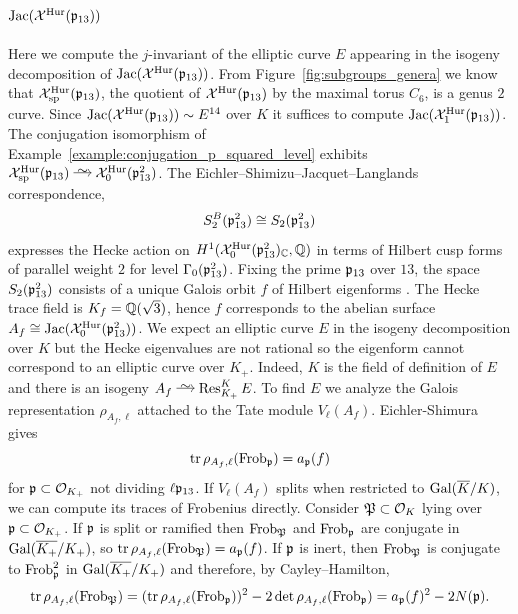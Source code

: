 \documentclass[main.tex]{subfiles}
\begin{document}
\subsection{$\operatorname{\mathrm{Jac}}(\mathcal{X}^{\mathrm{Hur}}(\mathfrak{p}_{13}))$}

Here we compute the $j$-invariant of the elliptic curve $E$ appearing in the isogeny decomposition of $\operatorname{\mathrm{Jac}}(\mathcal{X}^{\mathrm{Hur}}(\mathfrak{p}_{13}))$. From Figure~\ref{fig:subgroups_genera} we know that $\mathcal{X}_{\mathrm{sp}}^{\mathrm{Hur}}(\mathfrak{p}_{13})$, the quotient of $\mathcal{X}^{\mathrm{Hur}}(\mathfrak{p}_{13})$ by the maximal torus $C_6$, is a genus $2$ curve. Since $\operatorname{\mathrm{Jac}}(\mathcal{X}^{\mathrm{Hur}}(\mathfrak{p}_{13})) \sim E^{14}$ over $K$ it suffices to compute $\operatorname{\mathrm{Jac}}(\mathcal{X}_1^{\mathrm{Hur}}(\mathfrak{p}_{13}))$. The conjugation isomorphism of Example~\ref{example:conjugation_p_squared_level} exhibits $\X_{\mathrm{sp}}^{\Hur}(\p_{13}) \iso \X_0^{\Hur}(\p_{13}^2)$. The Eichler--Shimizu--Jacquet--Langlands correspondence,
\[ S^B_2(\mathfrak{p}_{13}^2) \cong S_2(\mathfrak{p}_{13}^2) \]
expresses the Hecke action on $H^1(\mathcal{X}_0^{\mathrm{Hur}}(\mathfrak{p}_{13}^2)_{\mathbb{C}}, \mathbb{Q})$ in terms of Hilbert cusp forms of parallel weight $2$ for level $\Gamma_0(\mathfrak{p}_{13}^2)$. Fixing the prime $\mathfrak{p}_{13}$ over $13$, the space $S_2(\mathfrak{p}_{13}^2)$ consists of a unique Galois orbit $f$ of Hilbert eigenforms \cite{lmfdb:hmf-3.3.49.1-169.4-a}. The Hecke trace field is $K_f = \mathbb{Q}(\sqrt{3})$, hence $f$ corresponds to the abelian surface $A_f \cong \operatorname{\mathrm{Jac}}(\mathcal{X}_0^{\mathrm{Hur}}(\mathfrak{p}_{13}^2))$. We expect an elliptic curve $E$ in the isogeny decomposition over $K$ but the Hecke eigenvalues are not rational so the eigenform cannot correspond to an elliptic curve over $K_+$. Indeed, $K$ is the field of definition of $E$ and there is an isogeny $A_f \iso \Res^{K}_{K_+} E$. To find $E$ we analyze the Galois representation $\rho_{A_f, \ell}$ attached to the Tate module $V_{\ell}(A_f)$. Eichler-Shimura gives
\[ \operatorname{\mathrm{tr}}{\rho_{A_f, \ell}(\operatorname{\mathrm{Frob}}_{\mathfrak{p}})} = a_{\mathfrak{p}}(f) \]
for $\mathfrak{p} \subset \mathcal{O}_{K_+}$ not dividing $\ell \mathfrak{p}_{13}$.
If $V_{\ell}(A_f)$ splits when restricted to $\operatorname{\mathrm{Gal}}(\overline{K} / K)$, we can compute its traces of Frobenius directly. Consider $\mathfrak{P} \subset \mathcal{O}_{K}$ lying over $\mathfrak{p} \subset \mathcal{O}_{K_+}$. If $\mathfrak{p}$ is split or ramified then $\operatorname{\mathrm{Frob}}_{\mathfrak{P}}$ and $\operatorname{\mathrm{Frob}}_{\mathfrak{p}}$ are conjugate in $\operatorname{\mathrm{Gal}}(\overline{K_+} / K_+)$, so $\operatorname{\mathrm{tr}}{\rho_{A_f, \ell}(\operatorname{\mathrm{Frob}}_{\mathfrak{P}})} = a_{\mathfrak{p}}(f)$. If $\mathfrak{p}$ is inert, then $\operatorname{\mathrm{Frob}}_{\mathfrak{P}}$ is conjugate to $\operatorname{\mathrm{Frob}}_{\mathfrak{p}}^2$ in $\operatorname{\mathrm{Gal}}(\overline{K_+} / K_+)$ and therefore, by Cayley--Hamilton,
\[ \operatorname{\mathrm{tr}}{\rho_{A_f, \ell}(\operatorname{\mathrm{Frob}}_{\mathfrak{P}})} = (\operatorname{\mathrm{tr}}{\rho_{A_f, \ell}(\operatorname{\mathrm{Frob}}_{\mathfrak{p}})})^2 - 2 \det{\rho_{A_f, \ell}(\operatorname{\mathrm{Frob}}_{\mathfrak{p}})} = a_{\mathfrak{p}}(f)^2 - 2 N(\mathfrak{p}). \]
\end{document}
